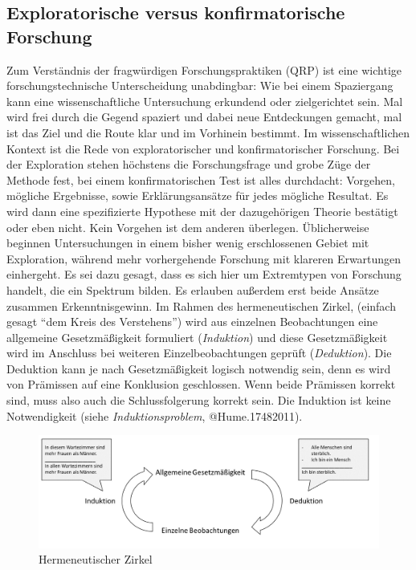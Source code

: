 \documentclass[
  letterpaper,
  DIV=11,
  numbers=noendperiod]{scrreprt}
\begin{document}
\subsection{Exploratorische versus konfirmatorische
Forschung}\label{exploratorische-versus-konfirmatorische-forschung}

Zum Verständnis der fragwürdigen Forschungspraktiken (QRP) ist eine
wichtige forschungstechnische Unterscheidung unabdingbar: Wie bei einem
Spaziergang kann eine wissenschaftliche Untersuchung erkundend oder
zielgerichtet sein. Mal wird frei durch die Gegend spaziert und dabei
neue Entdeckungen gemacht, mal ist das Ziel und die Route klar und im
Vorhinein bestimmt. Im wissenschaftlichen Kontext ist die Rede von
exploratorischer und konfirmatorischer Forschung. Bei der Exploration
stehen höchstens die Forschungsfrage und grobe Züge der Methode fest,
bei einem konfirmatorischen Test ist alles durchdacht: Vorgehen,
mögliche Ergebnisse, sowie Erklärungsansätze für jedes mögliche
Resultat. Es wird dann eine spezifizierte Hypothese mit der
dazugehörigen Theorie bestätigt oder eben nicht. Kein Vorgehen ist dem
anderen überlegen. Üblicherweise beginnen Untersuchungen in einem bisher
wenig erschlossenen Gebiet mit Exploration, während mehr vorhergehende
Forschung mit klareren Erwartungen einhergeht. Es sei dazu gesagt, dass
es sich hier um Extremtypen von Forschung handelt, die ein Spektrum
bilden. Es erlauben außerdem erst beide Ansätze zusammen
Erkenntnisgewinn. Im Rahmen des hermeneutischen Zirkel, (einfach gesagt
``dem Kreis des Verstehens'') wird aus einzelnen Beobachtungen eine
allgemeine Gesetzmäßigkeit formuliert (\emph{Induktion}) und diese
Gesetzmäßigkeit wird im Anschluss bei weiteren Einzelbeobachtungen
geprüft (\emph{Deduktion}). Die Deduktion kann je nach Gesetzmäßigkeit
logisch notwendig sein, denn es wird von Prämissen auf eine Konklusion
geschlossen. Wenn beide Prämissen korrekt sind, muss also auch die
Schlussfolgerung korrekt sein. Die Induktion ist keine Notwendigkeit
(siehe \emph{Induktionsproblem}, @Hume.17482011).

\begin{figure}[H]

{\centering \includegraphics{images/hermeneutischerzirkel.jpg}

}

\caption{Hermeneutischer Zirkel}

\end{figure}%
\end{document}
